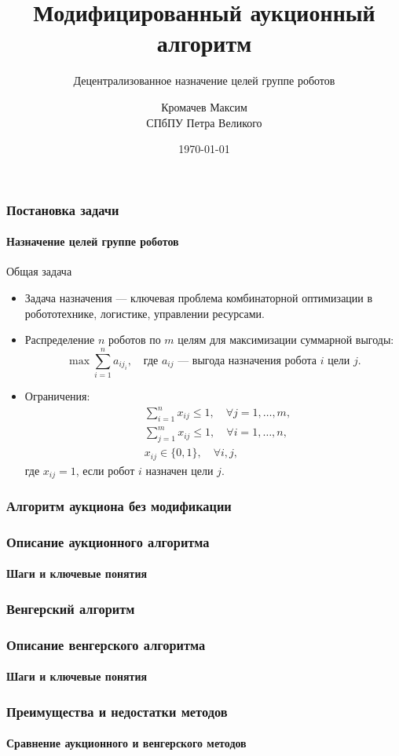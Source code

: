 \documentclass{beamer}
\title{Модифицированный аукционный алгоритм}
\subtitle{Децентрализованное назначение целей группе роботов}
\author{\hspace*{\fill}Кромачев Максим\\\hspace*{\fill}\footnotesize СПбПУ Петра Великого}
\date{\hspace*{\fill}\today}
\begin{document}
	
	\begin{frame}
		\titlepage
	\end{frame}
	
	\begin{frame}
		\frametitle{Постановка задачи}
		\framesubtitle{Назначение целей группе роботов}
		
		\begin{block}{Общая задача}
			\begin{itemize}
				\item Задача назначения — ключевая проблема комбинаторной оптимизации в робототехнике, логистике, управлении ресурсами.
				\item Распределение $n$ роботов по $m$ целям для максимизации суммарной выгоды:
				\[
				\max \sum_{i=1}^n a_{ij_i}, \quad \text{где } a_{ij} \text{ — выгода назначения робота } i \text{ цели } j.
				\]
				\item Ограничения:
				\[
				\begin{aligned}
					&\sum_{i=1}^n x_{ij} \leq 1, \quad \forall j = 1, \ldots, m, \\
					&\sum_{j=1}^m x_{ij} \leq 1, \quad \forall i = 1, \ldots, n, \\
					&x_{ij} \in \{0, 1\}, \quad \forall i, j,
				\end{aligned}
				\]
				где $x_{ij} = 1$, если робот $i$ назначен цели $j$.
			\end{itemize}
		\end{block}
	\end{frame}
	
	\begin{frame}
		\frametitle{Алгоритм аукциона без модификации}
	\end{frame}

	\begin{frame}
	\frametitle{Описание аукционного алгоритма}
	\framesubtitle{Шаги и ключевые понятия}
	\end{frame}
	
	\begin{frame}
		\frametitle{Венгерский алгоритм}
	\end{frame}

	\begin{frame}
		\frametitle{Описание венгерского алгоритма}
		\framesubtitle{Шаги и ключевые понятия}
	\end{frame}

	\begin{frame}
		\frametitle{Преимущества и недостатки методов}
		\framesubtitle{Сравнение аукционного и венгерского методов}
	\end{frame}
	
\end{document}
